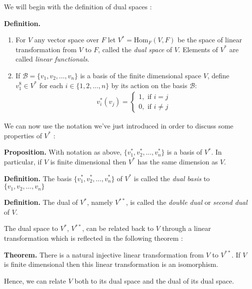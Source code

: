\documentclass[11pt, reqno]{amsart}
\theoremstyle{plain}
\theoremstyle{definition}
\theoremstyle{example}
\def\Hom{\mathrm{Hom}}
\begin{document}
We will begin with the definition of dual spaces \cite[\S 11.3, p. 431]{dummit}:

\par
\textbf{Definition.}
\begin{enumerate}
\item For $V$ any vector space over $F$ let $V^* = \Hom_F(V,F)$ be the space of linear transformation from $V$ to $F$, called the \textit{dual space} of $V$. Elements of $V^*$ are called \textit{linear functionals}.
\item If $\mathcal{B} = \{v_1, v_2, \ldots, v_n\}$ is a basis of the finite dimensional space $V$, define $v_1^8 \in V^*$ for each $i \in \{1, 2, \ldots, n\}$ by its action on the basis $\mathcal{B}$:
\begin{align*}
v_i^*(v_j) = \begin{cases} 
      1, \text{ if } i = j \\
      0, \text{ if } i \neq j 
   \end{cases}
\end{align*}
\end{enumerate}

We can now use the notation we've just introduced in order to discuss some properties of $V^*$ \cite[\S 11.3, p. 432]{dummit}:

\par
\textbf{Proposition.} With notation as above, $\{v_1^*, v_2^*, \ldots, v_n^*\}$ is a basis of $V^*$. In particular, if $V$ is finite dimensional then $V^*$ has the same dimension as $V$.

\par
\textbf{Definition.} The basis $\{v_1^*, v_2^*, \ldots, v_n^*\}$ of $V^*$ is called the \textit{dual basis} to $\{v_1, v_2, \ldots, v_n\}$

\par
\textbf{Definition.} The dual of $V^*$, namely $V^{**}$, is called the \textit{double dual} or \textit{second dual} of $V$.

The dual space to $V^*$, $V^{**}$, can be related back to $V$ through a linear transformation which is reflected in the following theorem \cite[\S 11.3, p. 433]{dummit}:

\par
\textbf{Theorem.} There is a natural injective linear transformation from $V$ to $V^{**}$. If $V$ is finite dimensional then this linear transformation is an isomorphism.

\par
Hence, we can relate $V$ both to its dual space and the dual of its dual space.
\end{document}
